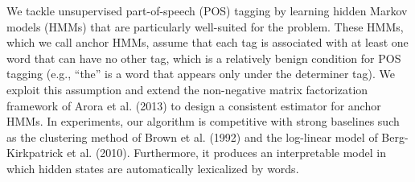 We tackle unsupervised part-of-speech (POS) tagging by learning hidden Markov models (HMMs) that are particularly well-suited for the problem. These HMMs, which we call anchor HMMs, assume that each tag is associated with at least one word that can have no other tag, which is a relatively benign condition for POS tagging (e.g., ``the'' is a word that appears only under the determiner tag). We exploit this assumption and extend the non-negative matrix factorization framework of Arora et al. (2013) to design a consistent estimator for anchor HMMs. In experiments, our algorithm is competitive with strong baselines such as the clustering method of Brown et al. (1992) and the log-linear model of Berg-Kirkpatrick et al. (2010). Furthermore, it produces an interpretable model in which hidden states are automatically lexicalized by words.
